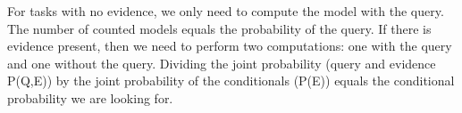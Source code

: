 For tasks with no evidence, we only need to compute the model with the query. The number of counted models equals the probability of the query. If there is evidence present, then we need to perform two computations: one with the query and one without the query. Dividing the joint probability (query and evidence P(Q,E)) by the joint probability of the conditionals (P(E)) equals the conditional probability we are looking for.

\begin{table}[h]
\centering
\caption{Results task12}
\label{table:results-task12}
\end{table}

